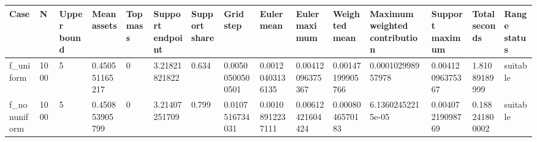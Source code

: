 \begin{tabular}{lllllllllllllll}
\hline
Case & N & Upper bound & Mean assets & Top mass & Support endpoint & Support share & Grid step & Euler mean & Euler maximum & Weighted mean & Maximum weighted contribution & Support maximum & Total seconds & Range status \\
\hline
f\_uniform & 1000 & 5 & 0.450551165217 & 0 & 3.21821821822 & 0.634 & 0.00500500500501 & 0.00120403136135 & 0.00412096375367 & 0.00147199905766 & 0.000102998957978 & 0.00412096375367 & 1.81089189999 & suitable \\
f\_nonuniform & 1000 & 5 & 0.450853905799 & 0 & 3.21407251709 & 0.799 & 0.0107516734031 & 0.00108912237111 & 0.00612421604424 & 0.0008046570183 & 6.13602452215e-05 & 0.00407219098769 & 0.188241800002 & suitable \\
\hline
\end{tabular}
